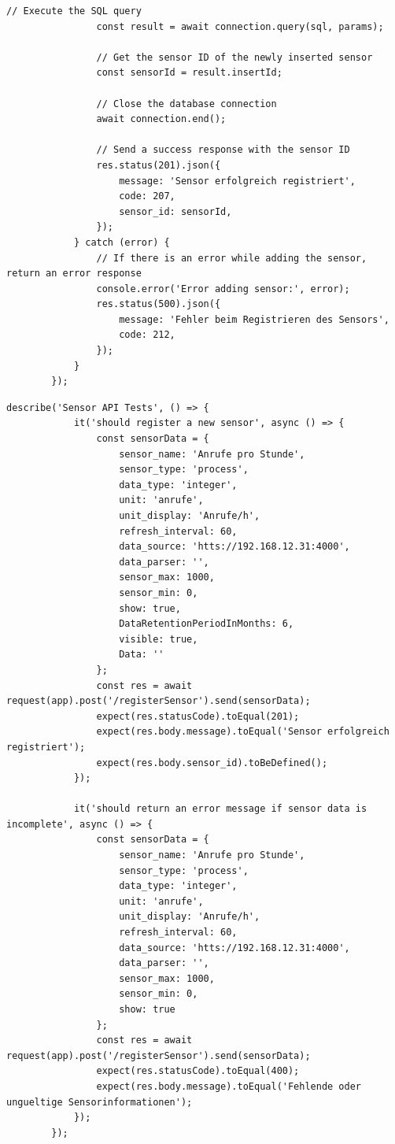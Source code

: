 \begin{lstlisting}[caption={Anmeldung eines neuen Sensors (Backend)}, style=js]
				// Execute the SQL query
				const result = await connection.query(sql, params);

				// Get the sensor ID of the newly inserted sensor
				const sensorId = result.insertId;

				// Close the database connection
				await connection.end();

				// Send a success response with the sensor ID
				res.status(201).json({
					message: 'Sensor erfolgreich registriert',
					code: 207,
					sensor_id: sensorId,
				});
			} catch (error) {
				// If there is an error while adding the sensor, return an error response
				console.error('Error adding sensor:', error);
				res.status(500).json({
					message: 'Fehler beim Registrieren des Sensors',
					code: 212,
				});
			}
		});
	\end{lstlisting}
\clearpage


	\begin{lstlisting}[caption={Anmeldung eines neuen Sensors (Backend) Unit-Tests}, style=js]
		describe('Sensor API Tests', () => {
			it('should register a new sensor', async () => {
				const sensorData = {
					sensor_name: 'Anrufe pro Stunde',
					sensor_type: 'process',
					data_type: 'integer',
					unit: 'anrufe',
					unit_display: 'Anrufe/h',
					refresh_interval: 60,
					data_source: 'htts://192.168.12.31:4000',
					data_parser: '',
					sensor_max: 1000,
					sensor_min: 0,
					show: true,
					DataRetentionPeriodInMonths: 6,
					visible: true,
					Data: ''
				};
				const res = await request(app).post('/registerSensor').send(sensorData);
				expect(res.statusCode).toEqual(201);
				expect(res.body.message).toEqual('Sensor erfolgreich registriert');
				expect(res.body.sensor_id).toBeDefined();
			});

			it('should return an error message if sensor data is incomplete', async () => {
				const sensorData = {
					sensor_name: 'Anrufe pro Stunde',
					sensor_type: 'process',
					data_type: 'integer',
					unit: 'anrufe',
					unit_display: 'Anrufe/h',
					refresh_interval: 60,
					data_source: 'htts://192.168.12.31:4000',
					data_parser: '',
					sensor_max: 1000,
					sensor_min: 0,
					show: true
				};
				const res = await request(app).post('/registerSensor').send(sensorData);
				expect(res.statusCode).toEqual(400);
				expect(res.body.message).toEqual('Fehlende oder ungueltige Sensorinformationen');
			});
		});
	\end{lstlisting}
\clearpage


